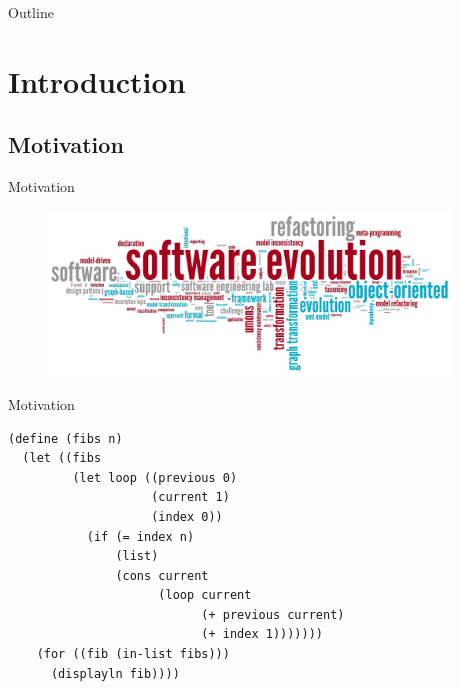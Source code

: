 \documentclass[xcolor=dvipsnames, 14pt]{beamer}
\begin{document}
\begin{frame}{Outline}
  \tableofcontents[sectionsonly] %
\end{frame}

\section{Introduction}
\subsection{Motivation}

\begin{frame}{Motivation}
\begin{figure}[htbp]
  \centering
  \includegraphics[width=0.95\textwidth]{img/softwareEvolution.png}
  \label{fig:SE}
\end{figure}
\end{frame}
\begin{frame}[fragile]{Motivation}
\begin{Verbatim}[fontsize=\footnotesize]
(define (fibs n)
  (let ((fibs
         (let loop ((previous 0)
                    (current 1)
                    (index 0))
           (if (= index n)
               (list)
               (cons current
                     (loop current
                           (+ previous current)
                           (+ index 1)))))))
    (for ((fib (in-list fibs)))
      (displayln fib))))
\end{Verbatim}
\end{frame}
\end{document}
